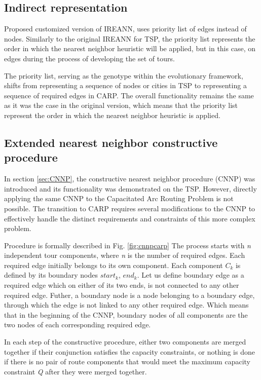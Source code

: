 \documentclass[twoside]{ctuthesis}
\theoremstyle{plain}
\theoremstyle{definition}
\theoremstyle{note}
\begin{document}
\subsection{Indirect representation}
\label{sec:indirectcarp}
Proposed customized version of IREANN, uses priority list of edges instead of nodes. Similarly to the original IREANN \cite{kubalik2014novel} for TSP, the priority list represents the order in which the nearest neighbor heuristic will be applied, but in this case, on edges during the process of developing the set of tours.

The priority list, serving as the genotype within the evolutionary framework, shifts from representing a sequence of nodes or cities in TSP to representing a sequence of required edges in CARP. The overall functionality remains the same as it was the case in the original version, which means that the priority list represent the order in which the nearest neighbor heuristic is applied.

\subsection{Extended nearest neighbor constructive procedure}
\label{sec:CNNPCARP}
In section \ref{sec:CNNP}, the constructive nearest neighbor procedure (CNNP) was introduced and its functionality was demonstrated on the TSP. However, directly applying the same CNNP to the Capacitated Arc Routing Problem is not possible. The transition to CARP requires several modifications to the CNNP to effectively handle the distinct requirements and constraints of this more complex problem.

Procedure is formally described in Fig. \ref{fig:cnnpcarp}
The process starts with \emph{n} independent tour components, where \emph{n} is the number of required edges. Each required edge initially belongs to its own component. Each component \emph{$C_k$} is defined by its boundary nodes {\emph{$start_k$}, \emph{$end_k$}}. Let us define boundary edge as a required edge which on either of its two ends, is not connected to any other required edge. Futher, a boundary node is a node belonging to a boundary edge, through which the edge is not linked to any other required edge. Which means that in the beginning of the CNNP, boundary nodes of all components are the two nodes of each corresponding required edge.

In each step of the constructive procedure, either two components are merged together if their conjunction satisfies the capacity constraints, or nothing is done if there is no pair of route components that would meet the maximum capacity constraint \emph{Q} after they were merged together.
\end{document}
